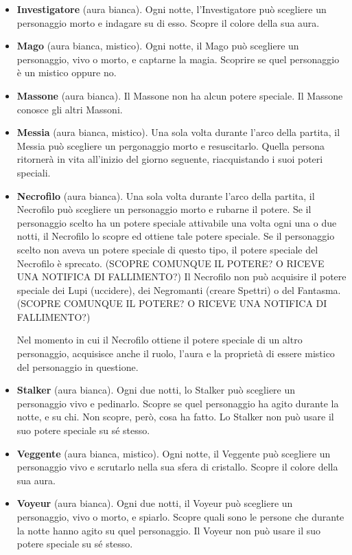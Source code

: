 \documentclass[a4paper,10pt]{article}
\begin{document}
\begin{itemize}
 \item {\bf Investigatore} (aura bianca). Ogni notte, l'Investigatore può scegliere un personaggio morto e indagare su di esso. Scopre il colore della sua aura.

 \item {\bf Mago} (aura bianca, mistico). Ogni notte, il Mago può scegliere un personaggio, vivo o morto, e captarne la magia. Scoprire se quel personaggio è un mistico oppure no.
 
 \item {\bf Massone} (aura bianca). Il Massone non ha alcun potere speciale. Il Massone conosce gli altri Massoni.
 
 \item {\bf Messia} (aura bianca, mistico). Una sola volta durante l'arco della partita, il Messia può scegliere un pergonaggio morto e resuscitarlo. Quella persona ritornerà in vita all'inizio del giorno seguente, riacquistando i suoi poteri speciali.


 \item {\bf Necrofilo} (aura bianca). Una sola volta durante l'arco della partita, il Necrofilo può scegliere un personaggio morto e rubarne il potere. 
 Se il personaggio scelto ha un potere speciale attivabile una volta ogni una o due notti, il Necrofilo lo scopre ed ottiene tale potere speciale.
 Se il personaggio scelto non aveva un potere speciale di questo tipo, il potere speciale del Necrofilo è sprecato. (SCOPRE COMUNQUE IL POTERE? O RICEVE UNA NOTIFICA DI FALLIMENTO?)
 Il Necrofilo non può acquisire il potere speciale dei Lupi (uccidere), dei Negromanti (creare Spettri) o del Fantasma. (SCOPRE COMUNQUE IL POTERE? O RICEVE UNA NOTIFICA DI FALLIMENTO?)
 
 Nel momento in cui il Necrofilo ottiene il potere speciale di un altro personaggio, acquisisce anche il ruolo, l'aura e la proprietà di essere mistico del personaggio in questione.

 \item {\bf Stalker} (aura bianca). Ogni due notti, lo Stalker può scegliere un personaggio vivo e pedinarlo. Scopre se quel personaggio ha agito durante la notte, e su chi. Non scopre, però, cosa ha fatto.
 Lo Stalker non può usare il suo potere speciale su sé stesso.
 
 \item {\bf Veggente} (aura bianca, mistico). Ogni notte, il Veggente può scegliere un personaggio vivo e scrutarlo nella sua sfera di cristallo. Scopre il colore della sua aura.

 \item {\bf Voyeur} (aura bianca). Ogni due notti, il Voyeur può scegliere un personaggio, vivo o morto, e spiarlo. Scopre quali sono le persone che durante la notte hanno agito su quel personaggio.
 Il Voyeur non può usare il suo potere speciale su sé stesso.


\end{itemize}
\end{document}

